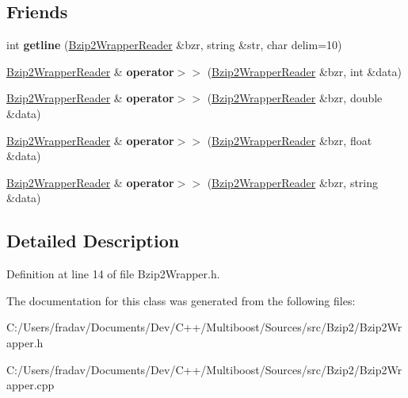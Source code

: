 \subsection*{Friends}
\begin{DoxyCompactItemize}
\item 
\hypertarget{classBzip2WrapperReader_af34f10f1f765b5e32daf25944b3718c9}{int {\bfseries getline} (\hyperlink{classBzip2WrapperReader}{Bzip2\-Wrapper\-Reader} \&bzr, string \&str, char delim=10)}\label{classBzip2WrapperReader_af34f10f1f765b5e32daf25944b3718c9}

\item 
\hypertarget{classBzip2WrapperReader_ad54bcd8ef71c86460b796fc498ee1488}{\hyperlink{classBzip2WrapperReader}{Bzip2\-Wrapper\-Reader} \& {\bfseries operator$>$$>$} (\hyperlink{classBzip2WrapperReader}{Bzip2\-Wrapper\-Reader} \&bzr, int \&data)}\label{classBzip2WrapperReader_ad54bcd8ef71c86460b796fc498ee1488}

\item 
\hypertarget{classBzip2WrapperReader_ad0b21e5d0f0a9bfe22fce4d69641c937}{\hyperlink{classBzip2WrapperReader}{Bzip2\-Wrapper\-Reader} \& {\bfseries operator$>$$>$} (\hyperlink{classBzip2WrapperReader}{Bzip2\-Wrapper\-Reader} \&bzr, double \&data)}\label{classBzip2WrapperReader_ad0b21e5d0f0a9bfe22fce4d69641c937}

\item 
\hypertarget{classBzip2WrapperReader_a91eb447f2868897cb0837de9591774fe}{\hyperlink{classBzip2WrapperReader}{Bzip2\-Wrapper\-Reader} \& {\bfseries operator$>$$>$} (\hyperlink{classBzip2WrapperReader}{Bzip2\-Wrapper\-Reader} \&bzr, float \&data)}\label{classBzip2WrapperReader_a91eb447f2868897cb0837de9591774fe}

\item 
\hypertarget{classBzip2WrapperReader_a316d97e6d79ceeb5fe08f37db427955c}{\hyperlink{classBzip2WrapperReader}{Bzip2\-Wrapper\-Reader} \& {\bfseries operator$>$$>$} (\hyperlink{classBzip2WrapperReader}{Bzip2\-Wrapper\-Reader} \&bzr, string \&data)}\label{classBzip2WrapperReader_a316d97e6d79ceeb5fe08f37db427955c}

\end{DoxyCompactItemize}


\subsection{Detailed Description}


Definition at line 14 of file Bzip2\-Wrapper.\-h.



The documentation for this class was generated from the following files\-:\begin{DoxyCompactItemize}
\item 
C\-:/\-Users/fradav/\-Documents/\-Dev/\-C++/\-Multiboost/\-Sources/src/\-Bzip2/Bzip2\-Wrapper.\-h\item 
C\-:/\-Users/fradav/\-Documents/\-Dev/\-C++/\-Multiboost/\-Sources/src/\-Bzip2/Bzip2\-Wrapper.\-cpp\end{DoxyCompactItemize}
